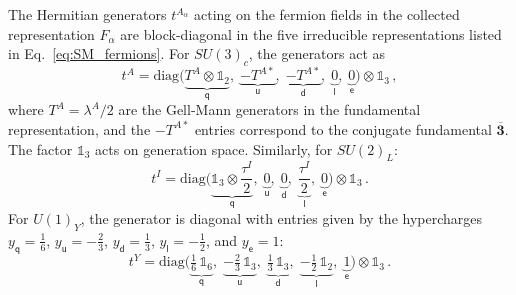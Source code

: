 The Hermitian generators $t^{A_\alpha}$ acting on the fermion fields in the collected representation $F_\alpha$ are block-diagonal in the five irreducible representations listed in Eq.~\eqref{eq:SM_fermions}. For $SU(3)_c$, the generators act as
\begin{equation}\label{eq:SU3_fermion_gens}
    t^A = \text{diag}\Big(\underbrace{T^A \otimes \mathbb{1}_2}_{\mathsf{q}},\; \underbrace{-T^{A*}}_{\mathsf{u}},\; \underbrace{-T^{A*}}_{\mathsf{d}},\; \underbrace{0}_{\mathsf{l}},\; \underbrace{0}_{\mathsf{e}}\Big) \otimes \mathbb{1}_3\,,
\end{equation}
where $T^A = \lambda^A/2$ are the Gell-Mann generators in the fundamental representation, and the $-T^{A*}$ entries correspond to the conjugate fundamental $\overline{\mathbf{3}}$. The factor $\mathbb{1}_3$ acts on generation space. Similarly, for $SU(2)_L$:
\begin{equation}\label{eq:SU2_fermion_gens}
    t^I = \text{diag}\Big(\underbrace{\mathbb{1}_3 \otimes \frac{\tau^I}{2}}_{\mathsf{q}},\;\underbrace{0}_{\mathsf{u}},\;\underbrace{0}_{\mathsf{d}},\; \underbrace{\frac{\tau^I}{2}}_{\mathsf{l}},\; \underbrace{0}_{\mathsf{e}}\Big) \otimes \mathbb{1}_3\,.
\end{equation}
For $U(1)_Y$, the generator is diagonal with entries given by the hypercharges $y_{\mathsf q} = \frac{1}{6}$, $y_{\mathsf u} = -\frac{2}{3}$, $y_{\mathsf d} = \frac{1}{3}$, $y_{\mathsf l} = -\frac{1}{2}$, and $y_{\mathsf e} = 1$:
\begin{equation}\label{eq:U1Y_fermion_gen}
    t^{Y} = \text{diag}\Big(\underbrace{\tfrac{1}{6}\,\mathbb{1}_{6}}_{\mathsf{q}},\;\underbrace{-\tfrac{2}{3}\,\mathbb{1}_{3}}_{\mathsf{u}},\;\underbrace{\tfrac{1}{3}\,\mathbb{1}_{3}}_{\mathsf{d}},\; \underbrace{-\tfrac{1}{2}\,\mathbb{1}_{2}}_{\mathsf{l}},\; \underbrace{1}_{\mathsf{e}}\Big) \otimes \mathbb{1}_3\,.
\end{equation}


